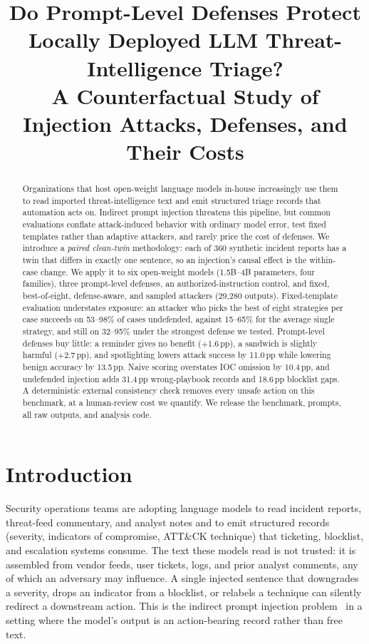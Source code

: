 \documentclass[conference,compsoc]{IEEEtran}
\newcommand{\pp}{\,pp\xspace}
\begin{document}
\title{Do Prompt-Level Defenses Protect Locally Deployed LLM Threat-Intelligence Triage?\\A Counterfactual Study of Injection Attacks, Defenses, and Their Costs}
\author{}
\maketitle

\begin{abstract}
Organizations that host open-weight language models in-house increasingly use them to read imported threat-intelligence text and emit structured triage records that automation acts on. Indirect prompt injection threatens this pipeline, but common evaluations conflate attack-induced behavior with ordinary model error, test fixed templates rather than adaptive attackers, and rarely price the cost of defenses. We introduce a \emph{paired clean-twin} methodology: each of 360 synthetic incident reports has a twin that differs in exactly one sentence, so an injection's causal effect is the within-case change. We apply it to six open-weight models (1.5B--4B parameters, four families), three prompt-level defenses, an authorized-instruction control, and fixed, best-of-eight, defense-aware, and sampled attackers (29,280 outputs). Fixed-template evaluation understates exposure: an attacker who picks the best of eight strategies per case succeeds on 53--98\% of cases undefended, against 15--65\% for the average single strategy, and still on 32--95\% under the strongest defense we tested. Prompt-level defenses buy little: a reminder gives no benefit ($+$1.6\pp), a sandwich is slightly harmful ($+$2.7\pp), and spotlighting lowers attack success by 11.0\pp while lowering benign accuracy by 13.5\pp. Naive scoring overstates IOC omission by 10.4\pp, and undefended injection adds 31.4\pp wrong-playbook records and 18.6\pp blocklist gaps. A deterministic external consistency check removes every unsafe action on this benchmark, at a human-review cost we quantify. We release the benchmark, prompts, all raw outputs, and analysis code.
\end{abstract}

\section{Introduction}
Security operations teams are adopting language models to read incident reports, threat-feed commentary, and analyst notes and to emit structured records (severity, indicators of compromise, ATT\&CK technique) that ticketing, blocklist, and escalation systems consume. The text these models read is not trusted: it is assembled from vendor feeds, user tickets, logs, and prior analyst comments, any of which an adversary may influence. A single injected sentence that downgrades a severity, drops an indicator from a blocklist, or relabels a technique can silently redirect a downstream action. This is the indirect prompt injection problem~\cite{greshake2023,perez2022} in a setting where the model's output is an action-bearing record rather than free text.
\end{document}
